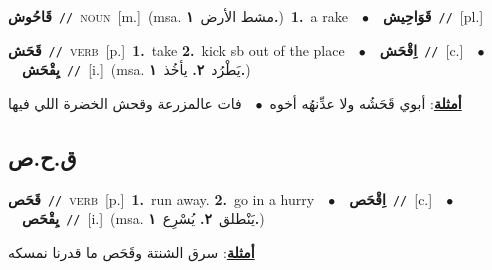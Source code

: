 \documentclass[10pt,a4paper,twoside]{article} %
\begin{document}
\begin{multicols}{2}
{\setlength\topsep{0pt}\textbf{\foreignlanguage{arabic}{قَاحُوش}}\ {\color{gray}\texttt{//}\color{black}}\ \textsc{noun}\ [m.]\ \color{gray}(msa. \foreignlanguage{arabic}{مشط الأرض}~\foreignlanguage{arabic}{\textbf{١.}})\color{black}\ \textbf{1.}~a rake\ \ $\bullet$\ \ \setlength\topsep{0pt}\textbf{\foreignlanguage{arabic}{قَوَاحِيش}}\ {\color{gray}\texttt{//}\color{black}}\ [pl.]\ } \vspace{2mm}

{\setlength\topsep{0pt}\textbf{\foreignlanguage{arabic}{قَحَش}}\ {\color{gray}\texttt{//}\color{black}}\ \textsc{verb}\ [p.]\ \textbf{1.}~take  \textbf{2.}~kick sb out of the place\ \ $\bullet$\ \ \setlength\topsep{0pt}\textbf{\foreignlanguage{arabic}{اِقْحَش}}\ {\color{gray}\texttt{//}\color{black}}\ [c.]\ \ $\bullet$\ \ \setlength\topsep{0pt}\textbf{\foreignlanguage{arabic}{يِقْحَش}}\ {\color{gray}\texttt{//}\color{black}}\ [i.]\ \color{gray}(msa. \foreignlanguage{arabic}{يَطْرُد}~\foreignlanguage{arabic}{\textbf{٢.}}  \foreignlanguage{arabic}{يأخُذ}~\foreignlanguage{arabic}{\textbf{١.}})\color{black}\  \begin{flushright}\color{gray}\foreignlanguage{arabic}{\textbf{\underline{\foreignlanguage{arabic}{أمثلة}}}: أبوي قَحَشُه ولا عدِّنهُه أخوه\ $\bullet$\ \  فات عالمزرعة وقحش الخضرة اللي فيها}\end{flushright}\color{black}} \vspace{2mm}

\vspace{-3mm}
\subsection*{\color{blue}\foreignlanguage{arabic}{ق.ح.ص}\color{blue}{}} 

{\setlength\topsep{0pt}\textbf{\foreignlanguage{arabic}{قَحَص}}\ {\color{gray}\texttt{//}\color{black}}\ \textsc{verb}\ [p.]\ \textbf{1.}~run away.  \textbf{2.}~go in a hurry\ \ $\bullet$\ \ \setlength\topsep{0pt}\textbf{\foreignlanguage{arabic}{اِقْحَص}}\ {\color{gray}\texttt{//}\color{black}}\ [c.]\ \ $\bullet$\ \ \setlength\topsep{0pt}\textbf{\foreignlanguage{arabic}{يِقْحَص}}\ {\color{gray}\texttt{//}\color{black}}\ [i.]\ \color{gray}(msa. \foreignlanguage{arabic}{يَنْطلق}~\foreignlanguage{arabic}{\textbf{٢.}}  \foreignlanguage{arabic}{يُسْرِع}~\foreignlanguage{arabic}{\textbf{١.}})\color{black}\  \begin{flushright}\color{gray}\foreignlanguage{arabic}{\textbf{\underline{\foreignlanguage{arabic}{أمثلة}}}: سرق الشنتة وقَحَص ما قدرنا نمسكه}\end{flushright}\color{black}} \vspace{2mm}


\end{multicols}
\end{document}
